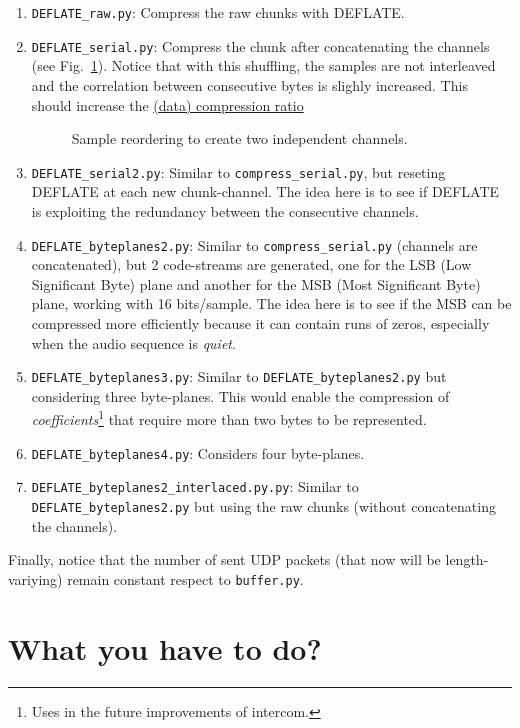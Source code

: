 \begin{enumerate}
\item \verb|DEFLATE_raw.py|: Compress the raw chunks with DEFLATE.
\item \verb|DEFLATE_serial.py|: Compress the chunk after concatenating
  the channels (see Fig.~\ref{fig:reordering}). Notice that with this
  shuffling, the samples are not interleaved and the correlation
  between consecutive bytes is slighly increased. This should increase
  the
  \href{https://en.wikipedia.org/wiki/Data_compression_ratio}{(data)
    compression ratio}
\begin{figure}
  \begin{center}
  \end{center}
  \caption{Sample reordering to create two independent channels.}
  \label{fig:reordering}
\end{figure}
\item \verb|DEFLATE_serial2.py|: Similar to \verb|compress_serial.py|, but
  reseting DEFLATE at each new chunk-channel. The idea here is to see
  if DEFLATE is exploiting the redundancy between the consecutive
  channels.
\item \verb|DEFLATE_byteplanes2.py|: Similar to
  \verb|compress_serial.py| (channels are concatenated), but 2
  code-streams are generated, one for the LSB (Low Significant Byte)
  plane and another for the MSB (Most Significant Byte) plane, working
  with 16 bits/sample. The idea here is to see if the MSB can be
  compressed more efficiently because it can contain runs of zeros,
  especially when the audio sequence is \emph{quiet}.
\item \verb|DEFLATE_byteplanes3.py|: Similar to
  \verb|DEFLATE_byteplanes2.py| but considering three
  byte-planes. This would enable the compression of
  \emph{coefficients}\footnote{Uses in the future improvements of
    intercom.} that require more than two bytes to be represented.
\item \verb|DEFLATE_byteplanes4.py|: Considers four byte-planes.
\item \verb|DEFLATE_byteplanes2_interlaced.py.py|: Similar to
  \verb|DEFLATE_byteplanes2.py| but using the raw chunks (without
  concatenating the channels).
\end{enumerate}

Finally, notice that the number of sent UDP packets (that now will be
length-variying) remain constant respect to \verb|buffer.py|.

\section{What you have to do?}

